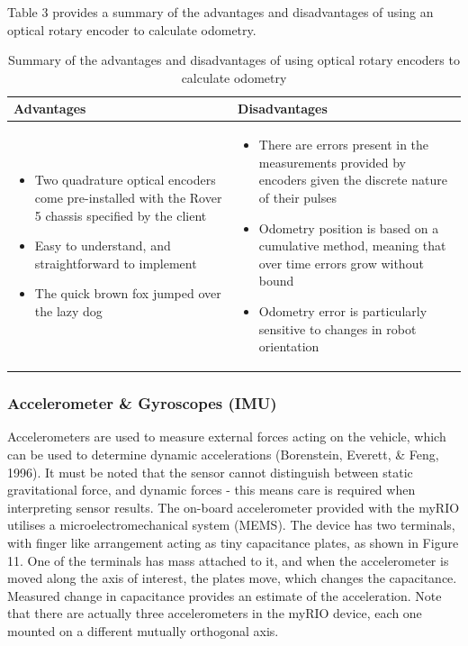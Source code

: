 \documentclass[a4paper]{article}
\begin{document}
Table 3 provides a summary of the advantages and disadvantages of using an optical rotary encoder to calculate odometry.

\begin{table}[h]
\centering
\caption{Summary of the advantages and disadvantages of using optical rotary encoders to calculate odometry} \footnotesize
\begin{tabular}{p{8cm}p{8cm}}
\toprule
\textbf{Advantages} & \textbf{Disadvantages}\\
\midrule
\begin{itemize}[leftmargin=0.3cm] \item Two quadrature optical encoders come pre-installed with the Rover 5 chassis specified by the client \item Easy to understand, and straightforward to implement \item The quick brown fox jumped over the lazy dog \end{itemize} & \begin{itemize}[leftmargin=0.3cm] \item There are errors present in the measurements provided by encoders given the discrete nature of their pulses \item Odometry position is based on a cumulative method, meaning that over time errors grow without bound \item Odometry error is particularly sensitive to changes in robot orientation \end{itemize}\\
\bottomrule
\end{tabular}
\end{table}

\newpage
\subsubsection{Accelerometer \& Gyroscopes (IMU)}
Accelerometers are used to measure external forces acting on the vehicle, which can be used to determine dynamic accelerations (Borenstein, Everett, \& Feng, 1996). It must be noted that the sensor cannot distinguish between static gravitational force, and dynamic forces - this means care is required when interpreting sensor results. The on-board accelerometer provided with the myRIO utilises a microelectromechanical system (MEMS). The device has two terminals, with finger like arrangement acting as tiny capacitance plates, as shown in Figure 11. One of the terminals has mass attached to it, and when the accelerometer is moved along the axis of interest, the plates move, which changes the capacitance. Measured change in capacitance provides an estimate of the acceleration. Note that there are actually three accelerometers in the myRIO device, each one mounted on a different mutually orthogonal axis.\\
\end{document}
